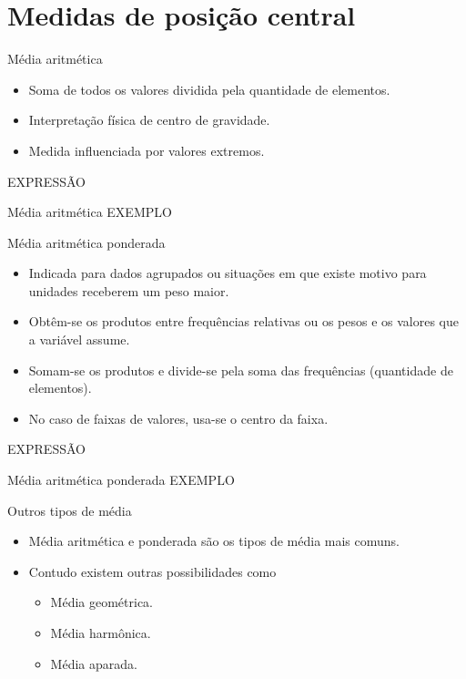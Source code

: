 \documentclass[
  ignorenonframetext,
  serif,
  professionalfont,
  usenames,
  dvipsnames,
  aspectratio = 169]{beamer}
\providecommand{\tightlist}{%
  \setlength{\itemsep}{0pt}\setlength{\parskip}{0pt}}
\renewcommand{\tightlist}{%
  \setlength{\itemsep}{0\baselineskip}
  \setlength{\parskip}{0.25\baselineskip}
}
\begin{document}
\hypertarget{medidas-de-posiuxe7uxe3o-central-2}{%
\section{Medidas de posição
central}\label{medidas-de-posiuxe7uxe3o-central-2}}

\begin{frame}{Média aritmética}
\protect\hypertarget{muxe9dia-aritmuxe9tica}{}
\begin{itemize}
\tightlist
\item
  Soma de todos os valores dividida pela quantidade de elementos.
\item
  Interpretação física de centro de gravidade.
\item
  Medida influenciada por valores extremos.
\end{itemize}

EXPRESSÃO
\end{frame}

\begin{frame}{Média aritmética}
\protect\hypertarget{muxe9dia-aritmuxe9tica-1}{}
EXEMPLO
\end{frame}

\begin{frame}{Média aritmética ponderada}
\protect\hypertarget{muxe9dia-aritmuxe9tica-ponderada}{}
\begin{itemize}
\tightlist
\item
  Indicada para dados agrupados ou situações em que existe motivo para
  unidades receberem um peso maior.
\item
  Obtêm-se os produtos entre frequências relativas ou os pesos e os
  valores que a variável assume.
\item
  Somam-se os produtos e divide-se pela soma das frequências (quantidade
  de elementos).
\item
  No caso de faixas de valores, usa-se o centro da faixa.
\end{itemize}

EXPRESSÃO
\end{frame}

\begin{frame}{Média aritmética ponderada}
\protect\hypertarget{muxe9dia-aritmuxe9tica-ponderada-1}{}
EXEMPLO
\end{frame}

\begin{frame}{Outros tipos de média}
\protect\hypertarget{outros-tipos-de-muxe9dia}{}
\begin{itemize}
\tightlist
\item
  Média aritmética e ponderada são os tipos de média mais comuns.
\item
  Contudo existem outras possibilidades como

  \begin{itemize}
  \tightlist
  \item
    Média geométrica.
  \item
    Média harmônica.
  \item
    Média aparada.
  \end{itemize}
\end{itemize}
\end{frame}
\end{document}
